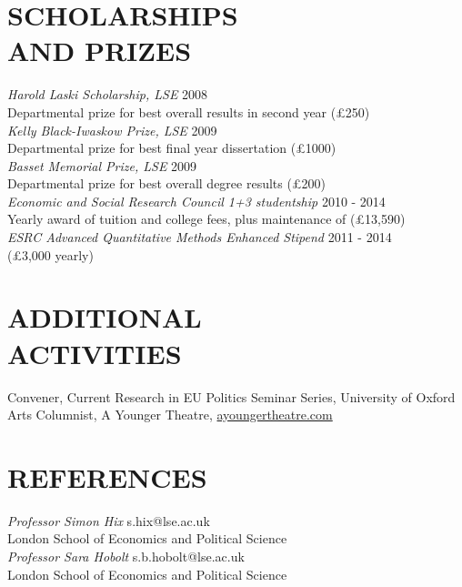 \documentclass[line,margin]{res}
\begin{document}
\begin{resume}
                
\section{SCHOLARSHIPS \\ AND PRIZES}  {\sl Harold Laski Scholarship, LSE} \hfill 2008 \\
Departmental prize for best overall results in second year (\pounds 250)\\
{\sl Kelly Black-Iwaskow Prize, LSE} \hfill 2009 \\
Departmental prize for best final year dissertation (\pounds 1000)\\          
{\sl Basset Memorial Prize, LSE} \hfill 2009 \\
Departmental prize for best overall degree results (\pounds 200)\\
{\sl Economic and Social Research Council 1+3 studentship} \hfill 2010 - 2014 \\
Yearly award of tuition and college fees, plus maintenance of (\pounds 13,590)\\
{\sl ESRC Advanced Quantitative Methods Enhanced Stipend} \hfill 2011 - 2014 \\
(\pounds 3,000 yearly)


\section{ADDITIONAL \\ ACTIVITIES}             
            Convener, Current Research in EU Politics Seminar Series, University of Oxford \\
            Arts Columnist, A Younger Theatre, \url{ayoungertheatre.com} \\
 
\section{REFERENCES} {\sl Professor Simon Hix} \hfill s.hix@lse.ac.uk \\
                London School of Economics and Political Science\\
                {\sl Professor Sara Hobolt} \hfill s.b.hobolt@lse.ac.uk \\
                London School of Economics and Political Science

\end{resume}
\end{document}
